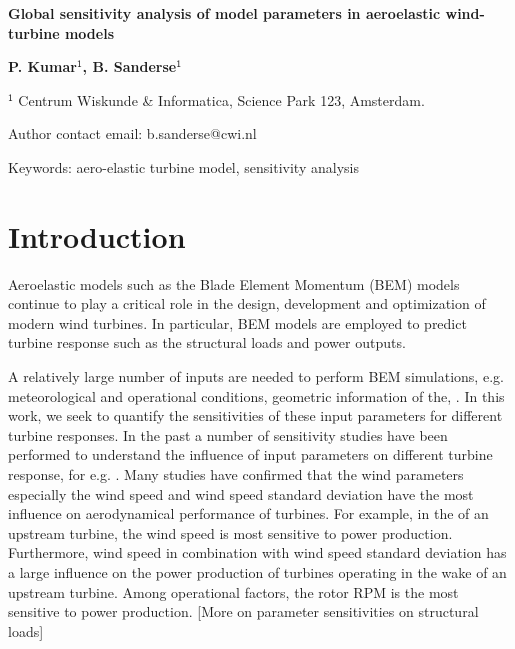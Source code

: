 \documentclass[11pt]{article}
\begin{document}
\raggedright  %

\vspace*{80pt}
{\LARGE \textbf{Global sensitivity analysis of model parameters in aeroelastic wind-turbine models}}
\vspace*{28pt}

\begin{addmargin}[2.5cm]{0em}%
\textbf{P. Kumar$^{\boldsymbol{\mathsf{1}}}$, B. Sanderse$^{\boldsymbol{\mathsf{1}}}$}

$^{\mathsf{1}}$ Centrum Wiskunde \& Informatica, Science Park 123, Amsterdam.


Author contact email: b.sanderse@cwi.nl

Keywords: aero-elastic turbine model, sensitivity analysis
\end{addmargin}

\section{Introduction}
Aeroelastic models such as the Blade Element Momentum (BEM) models \cite{HandBook} continue to play a critical role in the design, development and optimization of modern wind turbines. In particular, BEM models are employed to predict turbine response such as the structural loads and power outputs.

A relatively large number of inputs are needed to perform BEM simulations, e.g. meteorological and operational conditions, geometric information of the, . In this work, we seek to quantify the sensitivities of these input parameters for different turbine responses. In the past a number of sensitivity studies have been performed to understand the influence of input parameters on different turbine response, for e.g. \cite{moriarty2002effect, eggers2003wind, McKay2014, dykes2014sensitivity, Robertson2018}. Many studies have confirmed that the wind parameters especially the wind speed and wind speed standard deviation have the most influence on aerodynamical performance of turbines. For example, in the of an upstream turbine, the wind speed is most sensitive to power production. Furthermore, wind speed in combination with wind speed standard deviation has a large influence on the power production of turbines operating in the wake of an upstream turbine. Among operational factors, the rotor RPM is the most sensitive to power production. [More on parameter sensitivities on structural loads]
\end{document}
